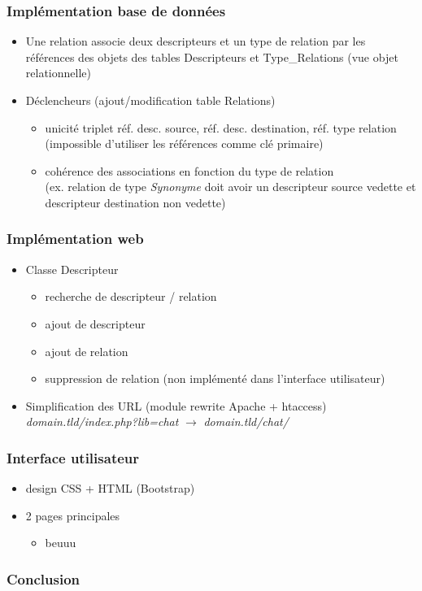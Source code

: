 \documentclass{beamer}
\begin{document}
\begin{frame}
\frametitle{Implémentation base de données}
\begin{itemize}
\item Une relation associe deux descripteurs et un type de relation par les références des objets des tables Descripteurs et Type\_Relations (vue objet relationnelle)
\item Déclencheurs (ajout/modification table Relations)
\begin{itemize}
\item unicité triplet réf. desc. source, réf. desc. destination, réf. type relation (impossible d'utiliser les références comme clé primaire)
\item cohérence des associations en fonction du type de relation\\ (ex. relation de type \emph{Synonyme} doit avoir un descripteur source vedette et descripteur destination non vedette)
\end{itemize}
\end{itemize} 
\end{frame}


\begin{frame}
\frametitle{Implémentation web}
\begin{itemize}
\item Classe Descripteur
\begin{itemize}
\item recherche de descripteur / relation
\item ajout de descripteur
\item ajout de relation
\item suppression de relation (non implémenté dans l'interface utilisateur)
\end{itemize}
\item Simplification des URL (module rewrite Apache + htaccess)\\ \emph{domain.tld/index.php?lib=chat} $\rightarrow$ \emph{domain.tld/chat/}
\end{itemize}
\end{frame}


\begin{frame}
\frametitle{Interface utilisateur}
\begin{itemize}
\item design CSS + HTML (Bootstrap)
\item 2 pages principales
\begin{itemize}
\item beuuu
\end{itemize}
\end{itemize}
\end{frame}


\begin{frame}
\frametitle{Conclusion}

\end{frame}
\end{document}
